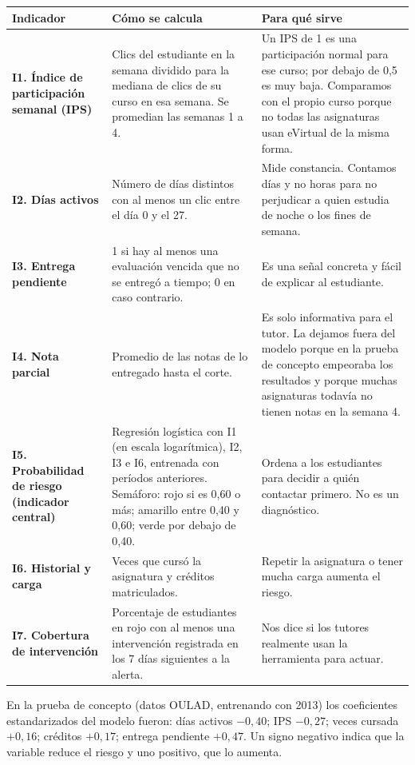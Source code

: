 \documentclass[10pt]{article}
\begin{document}
{\footnotesize
\begin{longtable}{P{4.6cm} P{10.2cm} P{9.4cm}}
\toprule
\textbf{Indicador} & \textbf{Cómo se calcula} & \textbf{Para qué sirve}\\
\midrule
\endhead
\bottomrule
\endfoot
\textbf{I1. Índice de participación semanal (IPS)} & Clics del estudiante en la semana dividido para la mediana de clics de su curso en esa semana. Se promedian las semanas 1 a 4. & Un IPS de 1 es una participación normal para ese curso; por debajo de 0,5 es muy baja. Comparamos con el propio curso porque no todas las asignaturas usan eVirtual de la misma forma.\\
\textbf{I2. Días activos} & Número de días distintos con al menos un clic entre el día 0 y el 27. & Mide constancia. Contamos días y no horas para no perjudicar a quien estudia de noche o los fines de semana.\\
\textbf{I3. Entrega pendiente} & 1 si hay al menos una evaluación vencida que no se entregó a tiempo; 0 en caso contrario. & Es una señal concreta y fácil de explicar al estudiante.\\
\textbf{I4. Nota parcial} & Promedio de las notas de lo entregado hasta el corte. & Es solo informativa para el tutor. La dejamos fuera del modelo porque en la prueba de concepto empeoraba los resultados y porque muchas asignaturas todavía no tienen notas en la semana 4.\\
\textbf{I5. Probabilidad de riesgo (indicador central)} & Regresión logística con I1 (en escala logarítmica), I2, I3 e I6, entrenada con períodos anteriores. Semáforo: rojo si es 0,60 o más; amarillo entre 0,40 y 0,60; verde por debajo de 0,40. & Ordena a los estudiantes para decidir a quién contactar primero. No es un diagnóstico.\\
\textbf{I6. Historial y carga} & Veces que cursó la asignatura y créditos matriculados. & Repetir la asignatura o tener mucha carga aumenta el riesgo.\\
\textbf{I7. Cobertura de intervención} & Porcentaje de estudiantes en rojo con al menos una intervención registrada en los 7 días siguientes a la alerta. & Nos dice si los tutores realmente usan la herramienta para actuar.\\
\end{longtable}
}

En la prueba de concepto (datos OULAD, entrenando con 2013) los coeficientes estandarizados del modelo fueron: días activos $-0{,}40$; IPS $-0{,}27$; veces cursada $+0{,}16$; créditos $+0{,}17$; entrega pendiente $+0{,}47$. Un signo negativo indica que la variable reduce el riesgo y uno positivo, que lo aumenta.
\end{document}
